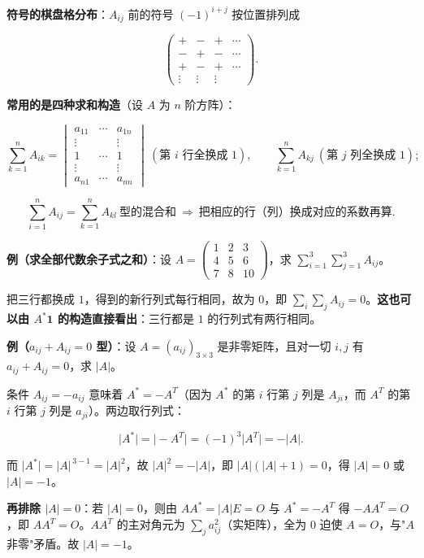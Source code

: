 \documentclass[11pt,openany,UTF8]{ctexbook}
\begin{document}
\textbf{符号的棋盘格分布}：$A_{ij}$ 前的符号 $(-1)^{i+j}$ 按位置排列成

\[\begin{pmatrix}+&-&+&\cdots\\-&+&-&\cdots\\+&-&+&\cdots\\\vdots&\vdots&\vdots&\end{pmatrix}.\]

\textbf{常用的是四种求和构造}（设 $A$ 为 $n$ 阶方阵）：

\[\sum_{k=1}^{n}A_{ik}=\begin{vmatrix}a_{11}&\cdots&a_{1n}\\\vdots&&\vdots\\1&\cdots&1\\\vdots&&\vdots\\a_{n1}&\cdots&a_{nn}\end{vmatrix}\ (\text{第 }i\text{ 行全换成 }1),\qquad \sum_{k=1}^{n}A_{kj}\ (\text{第 }j\text{ 列全换成 }1);\]

\[\sum_{i=1}^{n}A_{ij}=\sum_{k=1}^{n}A_{kl}\ \text{型的混合和}\ \Longrightarrow\ \text{把相应的行（列）换成对应的系数再算}.\]

\textbf{例（求全部代数余子式之和）}：设 $A=\begin{pmatrix}1&2&3\\4&5&6\\7&8&10\end{pmatrix}$，求 $\displaystyle\sum_{i=1}^{3}\sum_{j=1}^{3}A_{ij}$。

把三行都换成 $1$，得到的新行列式每行相同，故为 $0$，即 $\sum_i\sum_j A_{ij}=0$。\textbf{这也可以由 $A^*\mathbf{1}$ 的构造直接看出}：三行都是 $1$ 的行列式有两行相同。

\textbf{例（$a_{ij}+A_{ij}=0$ 型）}：设 $A=(a_{ij})_{3\times3}$ 是非零矩阵，且对一切 $i,j$ 有 $a_{ij}+A_{ij}=0$，求 $\vert A\vert$。

条件 $A_{ij}=-a_{ij}$ 意味着 $A^*=-A^T$（因为 $A^*$ 的第 $i$ 行第 $j$ 列是 $A_{ji}$，而 $A^T$ 的第 $i$ 行第 $j$ 列是 $a_{ji}$）。两边取行列式：

\[\vert A^*\vert=\vert -A^T\vert=(-1)^3\vert A^T\vert=-\vert A\vert .\]

而 $\vert A^*\vert=\vert A\vert^{\,3-1}=\vert A\vert^2$，故 $\vert A\vert^2=-\vert A\vert$，即 $\vert A\vert(\vert A\vert+1)=0$，得 $\vert A\vert=0$ 或 $\vert A\vert=-1$。

\textbf{再排除 $\vert A\vert=0$}：若 $\vert A\vert=0$，则由 $AA^*=\vert A\vert E=O$ 与 $A^*=-A^T$ 得 $-AA^T=O$，即 $AA^T=O$。$AA^T$ 的主对角元为 $\sum_j a_{ij}^2$（实矩阵），全为 $0$ 迫使 $A=O$，与"$A$ 非零"矛盾。故 $\vert A\vert=-1$。
\end{document}
